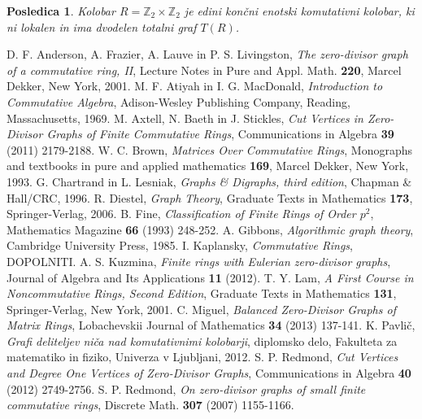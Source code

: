 \documentclass[a4paper, 12pt]{amsart}
\theoremstyle{definition} %
\theoremstyle{plain} %
\newtheorem{posledica}[definicija]{Posledica}
\newcommand{\Z}{\mathbb Z}
\begin{document}
\begin{posledica}
Kolobar $R=\Z_2 \times \Z_2$ je edini končni enotski komutativni kolobar, ki ni lokalen in ima dvodelen totalni graf $T(R)$.
\end{posledica}



\begin{thebibliography}{99}
 D. F. Anderson, A. Frazier, A. Lauve in P. S. Livingston, \emph{The zero-divisor graph of a commutative ring, II}, Lecture Notes in Pure and Appl. Math. {\bf 220}, Marcel Dekker, New York, 2001.
M. F. Atiyah in I. G. MacDonald, \emph{Introduction to Commutative Algebra}, Adison-Wesley Publishing Company, Reading, Massachusetts, 1969.
 M. Axtell, N. Baeth in J. Stickles, \emph{Cut Vertices in Zero-Divisor Graphs of Finite Commutative Rings}, Communications in Algebra {\bf 39} (2011) 2179-2188.
 W. C. Brown, \emph{Matrices Over Commutative Rings}, Monographs and textbooks in pure and applied mathematics {\bf 169}, Marcel Dekker, New York, 1993.
G. Chartrand in L. Lesniak, \emph{Graphs \& Digraphs, third edition}, Chapman \& Hall/CRC,  1996.
R. Diestel, \emph{Graph Theory}, Graduate Texts in Mathematics {\bf 173}, Springer-Verlag, 2006.
B. Fine, \emph{Classification of Finite Rings of Order $p^2$}, Mathematics Magazine {\bf 66} (1993) 248-252. 
A. Gibbons, \emph{Algorithmic graph theory}, Cambridge University Press, 1985.
I. Kaplansky, \emph{Commutative Rings}, DOPOLNITI.
A. S. Kuzmina, \emph{Finite rings with Eulerian zero-divisor graphs}, Journal of Algebra and Its Applications {\bf 11} (2012).
 T. Y. Lam, \emph{A First Course in Noncommutative Rings, Second Edition}, Graduate Texts in Mathematics {\bf 131}, Springer-Verlag, New York, 2001.
C. Miguel, \emph{Balanced Zero-Divisor Graphs of Matrix Rings}, Lobachevskii Journal of Mathematics {\bf 34} (2013) 137-141.
K. Pavlič, \emph{Grafi deliteljev niča nad komutativnimi kolobarji}, diplomsko delo, Fakulteta za matematiko in fiziko, Univerza v Ljubljani, 2012.
 S. P. Redmond, \emph{Cut Vertices and Degree One Vertices of Zero-Divisor Graphs}, Communications in Algebra {\bf 40} (2012) 2749-2756.
 S. P. Redmond, \emph{On zero-divisor graphs of small finite commutative rings}, Discrete Math. {\bf 307} (2007) 1155-1166.
\end{thebibliography}
\end{document}
